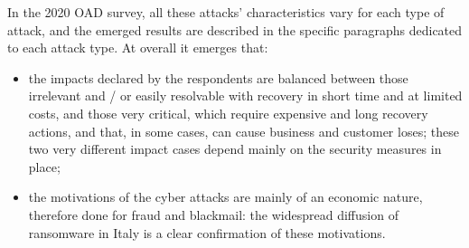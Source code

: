 \documentclass{easychair}
\begin{document}
In the 2020 OAD survey, all these attacks’ characteristics vary for each type of attack, and the emerged results are described in the specific paragraphs dedicated to each attack 
type. At overall it emerges that:
\begin{itemize}
\item the impacts declared by the respondents are balanced between those irrelevant and / or easily resolvable with recovery in short time and at limited costs, and those very 
critical, which require expensive and long recovery actions, and that, in some cases, can cause business and customer loses; these two very different impact cases depend mainly 
on the security measures in place;

\item the motivations of the cyber attacks are mainly of an economic nature, therefore done for fraud and blackmail: the widespread diffusion of ransomware in Italy is a clear 
confirmation of these motivations.
\end{itemize}
\end{document}
